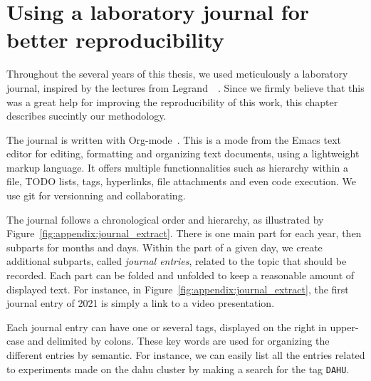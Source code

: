 \chapter{Using a laboratory journal for better reproducibility}
\label{chapter:orgmode}

    Throughout the several years of this thesis, we used meticulously a laboratory journal, inspired by the lectures
    from Legrand~\etal~\cite{RR_mooc,SMPE_course}. Since we firmly believe that this was a great help for improving the
    reproducibility of this work, this chapter describes succintly our methodology.

    The journal is written with Org-mode~\cite{orgmode}. This is a mode from the Emacs text editor for editing,
    formatting and organizing text documents, using a lightweight markup language. It offers multiple functionnalities
    such as hierarchy within a file, TODO lists, tags, hyperlinks, file attachments and even code execution. We use git
    for versionning and collaborating.

    The journal follows a chronological order and hierarchy, as illustrated by
    Figure~\ref{fig:appendix:journal_extract}. There is one main part for each year, then subparts for months and days.
    Within the part of a given day, we create additional subparts, called \emph{journal entries}, related to the topic
    that should be recorded. Each part can be folded and unfolded to keep a reasonable amount of displayed text. For
    instance, in Figure~\ref{fig:appendix:journal_extract}, the first journal entry of 2021 is simply a link to a video
    presentation.

    Each journal entry can have one or several tags, displayed on the right in upper-case and delimited by colons. These
    key words are used for organizing the different entries by semantic. For instance, we can easily list all the
    entries related to experiments made on the dahu cluster by making a search for the tag \texttt{DAHU}.

